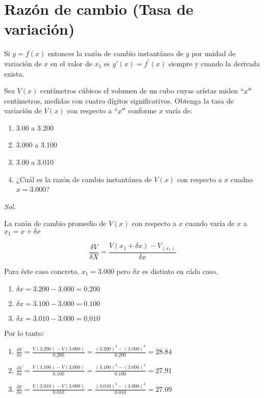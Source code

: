 \section{Razón de cambio (Tasa de variación)}

\begin{definition}
	Si $y=f(x)$ entonces la razón de cambio instantánea de $y$ por unidad de variación de $x$ en el valor de $x_1$ es $y'(x)=f^{\prime}(x)$ siempre y cuando la derivada exista.
\end{definition}

\begin{example}
	Sea $V(x)$ centímetros cúbicos el volumen de un cubo cuyas arístas miden $``x''$ centímetros, medidas con cuatro dígitos significativos. Obtenga la tasa de variación de $V(x)$ con respecto a $``x''$ conforme $x$ varía de:
	\begin{enumerate}
		\item 3.00 a 3.200
		\item 3.000 a 3.100
		\item 3.00 a 3.010
		\item ¿Cuál es la razón de cambio instantánea de $V(x)$ con respecto a $x$ cuadno $x=3.000$?
	\end{enumerate}
\end{example}

\textit{ Sol. }

La razón de cambio promedio de $V(x)$ con respecto a $x$ cuando varía de $x$ a $x_1=x+\delta x$

\begin{equation*}
	\frac{\delta V}{\delta X}=\frac{V\left(x_1+\delta x\right)-V_(x_1)}{\delta x}
\end{equation*}

Para éste caso concreto, $x_1=3.000$ pero $\delta x$ es distinto en cáda caso.

\begin{enumerate}
	\item $\delta x= 3.200-3.000=0.200$
	\item $\delta x= 3.100-3.000=0.100$
	\item $\delta x= 3.010-3.000=0.010$
\end{enumerate}

Por lo tanto:

\begin{enumerate}
	\item $\frac{\delta V}{\delta x}=\frac{V(3.200)-V(3.000)}{0.200}=\frac{(3.200)^3-(3.000)^3}{0.200}=28.84$
	\item $\frac{\delta V}{\delta x}=\frac{V(3.100)-V(3.000)}{0.100}=\frac{(3.100)^3-(3.000)^3}{0.100}=27.91$
	\item $\frac{\delta V}{\delta x}=\frac{V(3.010)-V(3.000)}{0.010}=\frac{(3.010)^3-(3.000)^3}{0.010}=27.09$
\end{enumerate}

